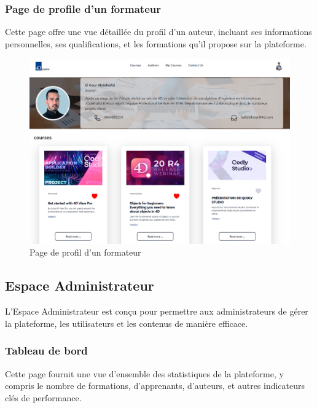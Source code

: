 \subsubsection{Page de profile d’un formateur}

Cette page offre une vue détaillée du profil d'un auteur, incluant ses informations personnelles, ses qualifications, et les formations qu'il propose sur la plateforme.

\begin{figure}[H]
    \centering
    \includegraphics[width=19cm]{Figures/detailsAuthor.png}
    \caption{Page de profil d’un formateur}
\end{figure}

\subsection{Espace Administrateur}

L'Espace Administrateur est conçu pour permettre aux administrateurs de gérer la plateforme, les utilisateurs et les contenus de manière efficace.

\subsubsection{Tableau de bord}

Cette page fournit une vue d'ensemble des statistiques de la plateforme, y compris le nombre de formations, d'apprenants, d'auteurs, et autres indicateurs clés de performance.


